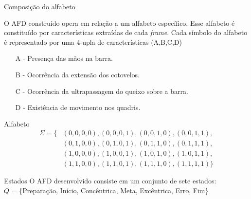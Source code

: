 \begin{frame}{Composição do alfabeto}
    
    O AFD construído opera em relação a um alfabeto específico. Esse alfabeto é constituído por características extraídas de cada \textit{frame}. Cada símbolo do alfabeto é representado por uma 4-upla de características (A,B,C,D)
    
    \begin{itemize}
        \item[A] - Presença das mãos na barra.
        \item[B] - Ocorrência da extensão dos cotovelos.
        \item[C] - Ocorrência da ultrapassagem do queixo sobre a barra.
        \item[D] - Existência de movimento nos quadris.
    \end{itemize} 

\end{frame}



\begin{frame}{Alfabeto}
    \[
    \begin{aligned}
    \Sigma = \{ &(0, 0, 0, 0), (0, 0, 0, 1), (0, 0, 1, 0), (0, 0, 1, 1), \\
                &(0, 1, 0, 0), (0, 1, 0, 1), (0, 1, 1, 0), (0, 1, 1, 1), \\
                &(1, 0, 0, 0), (1, 0, 0, 1), (1, 0, 1, 0), (1, 0, 1, 1), \\
                &(1, 1, 0, 0), (1, 1, 0, 1), (1, 1, 1, 0), (1, 1, 1, 1) \}
    \end{aligned}
    \]
\end{frame}


\begin{frame}{Estados}
    O AFD desenvolvido consiste em um conjunto de sete estados:\\
    \vspace{0.8cm}
    $Q$ = \{Preparação, Início, Concêntrica, Meta, Excêntrica, Erro, Fim\}
     
\end{frame}



